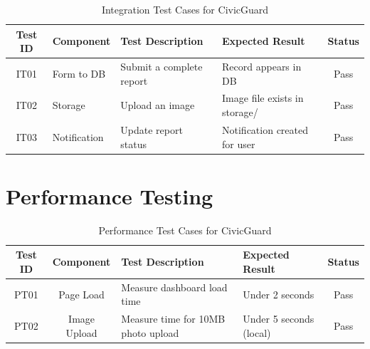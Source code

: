 \begin{table}[H]
    \centering
    \renewcommand{\arraystretch}{1.3}
    \small
    \begin{tabular}{|c|p{3cm}|p{3cm}|p{3cm}|c|}
        \hline
        \textbf{Test ID} & \textbf{Component} & \textbf{Test Description} & \textbf{Expected Result} & \textbf{Status} \\
        \hline
        IT01 & Form to DB & Submit a complete report & Record appears in DB & Pass \\
        \hline
        IT02 & Storage & Upload an image & Image file exists in storage/ & Pass \\
        \hline
        IT03 & Notification & Update report status & Notification created for user & Pass \\
        \hline
    \end{tabular}
    \caption{Integration Test Cases for CivicGuard}
\end{table}

\section{Performance Testing}
\begin{table}[H]
    \centering
    \renewcommand{\arraystretch}{1.3}
    \begin{tabular}{|c|c|p{4cm}|p{3cm}|c|}
        \hline
        \textbf{Test ID} & \textbf{Component} & \textbf{Test Description} & \textbf{Expected Result} & \textbf{Status} \\
        \hline
        PT01 & Page Load & Measure dashboard load time & Under 2 seconds & Pass \\
        \hline
        PT02 & Image Upload & Measure time for 10MB photo upload & Under 5 seconds (local) & Pass \\
        \hline
    \end{tabular}
    \caption{Performance Test Cases for CivicGuard}
\end{table}
